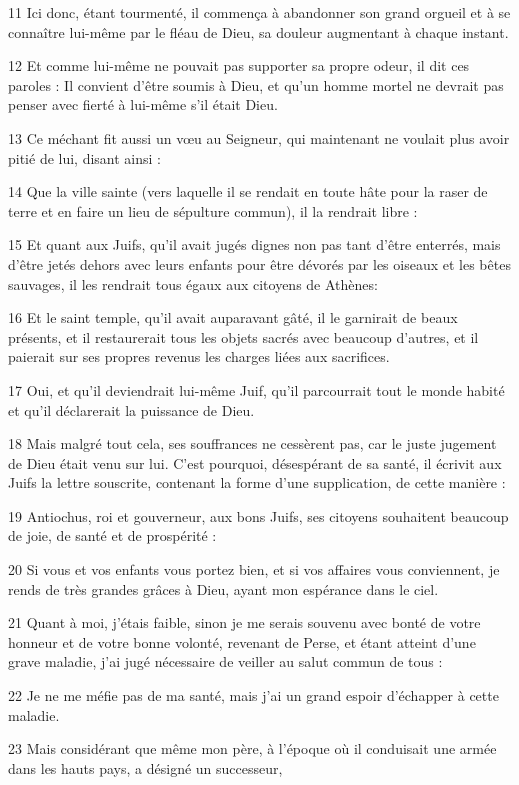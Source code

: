 \par 11 Ici donc, étant tourmenté, il commença à abandonner son grand orgueil et à se connaître lui-même par le fléau de Dieu, sa douleur augmentant à chaque instant.
\par 12 Et comme lui-même ne pouvait pas supporter sa propre odeur, il dit ces paroles : Il convient d'être soumis à Dieu, et qu'un homme mortel ne devrait pas penser avec fierté à lui-même s'il était Dieu.
\par 13 Ce méchant fit aussi un vœu au Seigneur, qui maintenant ne voulait plus avoir pitié de lui, disant ainsi :
\par 14 Que la ville sainte (vers laquelle il se rendait en toute hâte pour la raser de terre et en faire un lieu de sépulture commun), il la rendrait libre :
\par 15 Et quant aux Juifs, qu'il avait jugés dignes non pas tant d'être enterrés, mais d'être jetés dehors avec leurs enfants pour être dévorés par les oiseaux et les bêtes sauvages, il les rendrait tous égaux aux citoyens de Athènes:
\par 16 Et le saint temple, qu'il avait auparavant gâté, il le garnirait de beaux présents, et il restaurerait tous les objets sacrés avec beaucoup d'autres, et il paierait sur ses propres revenus les charges liées aux sacrifices.
\par 17 Oui, et qu'il deviendrait lui-même Juif, qu'il parcourrait tout le monde habité et qu'il déclarerait la puissance de Dieu.
\par 18 Mais malgré tout cela, ses souffrances ne cessèrent pas, car le juste jugement de Dieu était venu sur lui. C'est pourquoi, désespérant de sa santé, il écrivit aux Juifs la lettre souscrite, contenant la forme d'une supplication, de cette manière :
\par 19 Antiochus, roi et gouverneur, aux bons Juifs, ses citoyens souhaitent beaucoup de joie, de santé et de prospérité :
\par 20 Si vous et vos enfants vous portez bien, et si vos affaires vous conviennent, je rends de très grandes grâces à Dieu, ayant mon espérance dans le ciel.
\par 21 Quant à moi, j'étais faible, sinon je me serais souvenu avec bonté de votre honneur et de votre bonne volonté, revenant de Perse, et étant atteint d'une grave maladie, j'ai jugé nécessaire de veiller au salut commun de tous :
\par 22 Je ne me méfie pas de ma santé, mais j'ai un grand espoir d'échapper à cette maladie.
\par 23 Mais considérant que même mon père, à l'époque où il conduisait une armée dans les hauts pays, a désigné un successeur,
